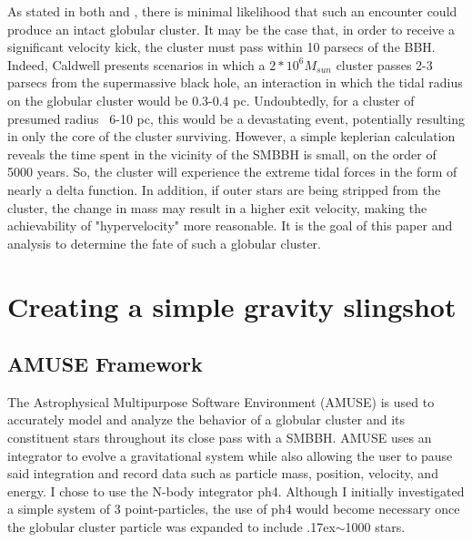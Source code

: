 \documentclass{aastex62}
\begin{document}
As stated in both \citet{cald14} and \citet{sam15}, there is minimal likelihood that such an encounter could produce an intact globular cluster. It may be the case that, in order to receive a significant velocity kick, the cluster must pass within 10 parsecs of the BBH. Indeed, Caldwell presents scenarios in which a $2*10^6M_{sun}$ cluster passes 2-3 parsecs from the supermassive black hole, an interaction in which the tidal radius on the globular cluster would be 0.3-0.4 pc. Undoubtedly, for a cluster of presumed radius ~6-10 pc, this would be a devastating event, potentially resulting in only the core of the cluster surviving. However, a simple keplerian calculation reveals the time spent in the vicinity of the SMBBH is small, on the order of 5000 years. So, the cluster will experience the extreme tidal forces in the form of nearly a delta function. In addition, if outer stars are being stripped from the cluster, the change in mass may result in a higher exit velocity, making the achievability of "hypervelocity" more reasonable. It is the goal of this paper and analysis to determine the fate of such a globular cluster. 

\section{Creating a simple gravity slingshot}
\subsection{AMUSE Framework}
The Astrophysical Multipurpose Software Environment (AMUSE) is used to accurately model and analyze the behavior of a globular cluster and its constituent stars throughout its close pass with a SMBBH. AMUSE uses an integrator to evolve a gravitational system while also allowing the user to pause said integration and record data such as particle mass, position, velocity, and energy. I chose to use the N-body integrator ph4. Although I initially investigated a simple system of 3 point-particles, the use of ph4 would become necessary once the globular cluster particle was expanded to include {\raise.17ex\hbox{$\scriptstyle\mathtt{\sim}$}}1000 stars. 
\end{document}
